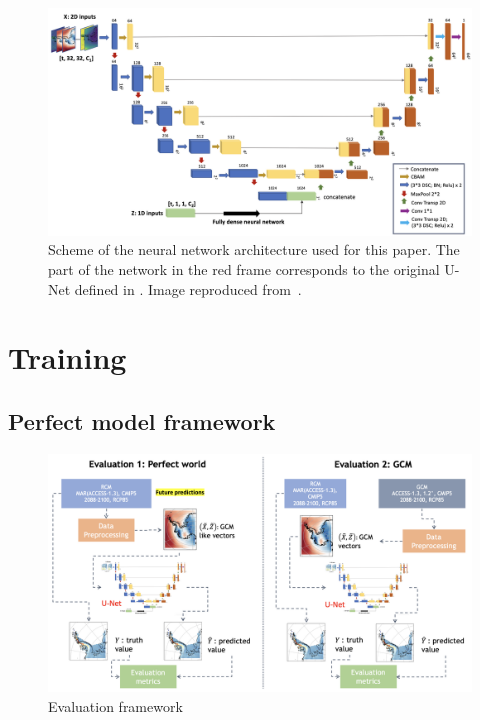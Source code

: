 \documentclass[a4paper,11pt,oneside]{report}
\begin{document}
\begin{figure}[!t]
  \centering
  \includegraphics[width=\columnwidth]{images/smatunet.png}
  \caption []{\small Scheme of the neural network architecture used for this paper. The part of the network in the red frame corresponds to the original U-Net defined in \cite{unet}. Image reproduced from~\cite{Doury}.}
  \vspace{-3mm}
  \label{fig:UNet-architecture}
\end{figure}

\section{Training}\label{subsec:training}
\subsection{Perfect model framework}\label{subsec:perfect-model-training}
\begin{figure}[!t]
  \centering
  \includegraphics[width=\columnwidth]{images/evaluation-framework.png}
  \caption []{\small Evaluation framework}
  \vspace{-3mm}
  \label{fig:UNet-architecture}
\end{figure}
\end{document}

